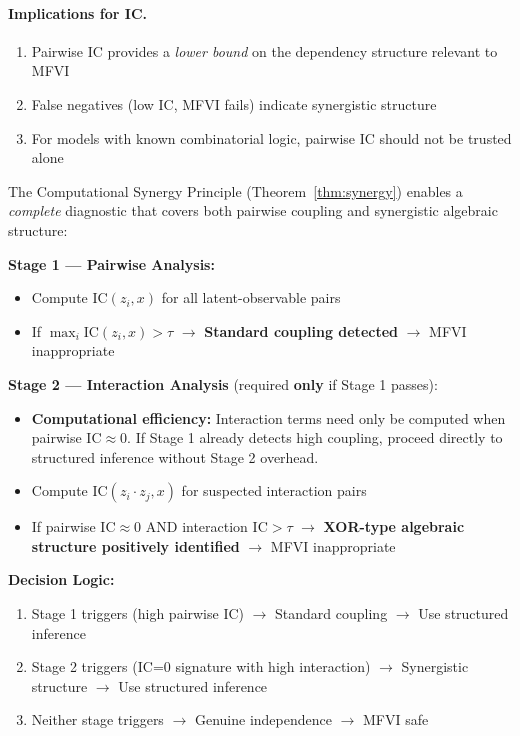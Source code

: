 \documentclass[10pt]{article} %
\theoremstyle{plain}
\theoremstyle{definition}
\newcommand{\IC}{\mathrm{IC}}  %
\begin{document}
\paragraph{Implications for IC.}
\begin{enumerate}
    \item Pairwise IC provides a \emph{lower bound} on the dependency structure relevant to MFVI
    \item False negatives (low IC, MFVI fails) indicate synergistic structure
    \item For models with known combinatorial logic, pairwise IC should not be trusted alone
\end{enumerate}

\begin{tcolorbox}[breakable, colback=blue!5, colframe=blue!50!black, title=\textbf{The Complete Two-Stage IC Diagnostic Protocol}, fonttitle=\bfseries]
The Computational Synergy Principle (Theorem~\ref{thm:synergy}) enables a \emph{complete} diagnostic that covers both pairwise coupling and synergistic algebraic structure:

\textbf{Stage 1 --- Pairwise Analysis:}
\begin{itemize}
    \item Compute $\IC(z_i, x)$ for all latent-observable pairs
    \item If $\max_i \IC(z_i, x) > \tau$ $\rightarrow$ \textbf{Standard coupling detected} $\rightarrow$ MFVI inappropriate
\end{itemize}

\textbf{Stage 2 --- Interaction Analysis} (required \textbf{only} if Stage 1 passes):
\begin{itemize}
    \item \textbf{Computational efficiency:} Interaction terms need only be computed when pairwise $\IC \approx 0$. If Stage 1 already detects high coupling, proceed directly to structured inference without Stage 2 overhead.
    \item Compute $\IC(z_i \cdot z_j, x)$ for suspected interaction pairs
    \item If pairwise $\IC \approx 0$ AND interaction $\IC > \tau$ $\rightarrow$ \textbf{XOR-type algebraic structure positively identified} $\rightarrow$ MFVI inappropriate
\end{itemize}

\textbf{Decision Logic:}
\begin{enumerate}
    \item Stage 1 triggers (high pairwise IC) $\rightarrow$ Standard coupling $\rightarrow$ Use structured inference
    \item Stage 2 triggers (IC=0 signature with high interaction) $\rightarrow$ Synergistic structure $\rightarrow$ Use structured inference
    \item Neither stage triggers $\rightarrow$ Genuine independence $\rightarrow$ MFVI safe
\end{enumerate}


\end{tcolorbox}
\end{document}

